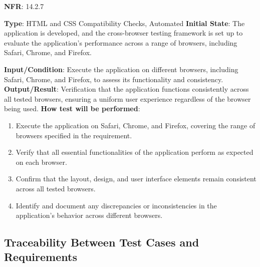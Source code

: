 \documentclass[12pt, titlepage]{article}
\begin{document}
\begin{enumerate}
\textbf{NFR}: 14.2.7

\textbf{Type}: HTML and CSS Compatibility Checks, Automated
\textbf{Initial State}: The application is developed, and the cross-browser testing framework is set up to evaluate the application's performance across a range of browsers, including Safari, Chrome, and Firefox.

\textbf{Input/Condition}: Execute the application on different browsers, including Safari, Chrome, and Firefox, to assess its functionality and consistency.
\textbf{Output/Result}: Verification that the application functions consistently across all tested browsers, ensuring a uniform user experience regardless of the browser being used.
\textbf{How test will be performed}: 
\begin{enumerate}
    \item Execute the application on Safari, Chrome, and Firefox, covering the range of browsers specified in the requirement.
    \item Verify that all essential functionalities of the application perform as expected on each browser.
    \item Confirm that the layout, design, and user interface elements remain consistent across all tested browsers.
    \item Identify and document any discrepancies or inconsistencies in the application's behavior across different browsers.

\end{enumerate}

























 
\end{enumerate}

\subsection{Traceability Between Test Cases and Requirements}
\end{document}
